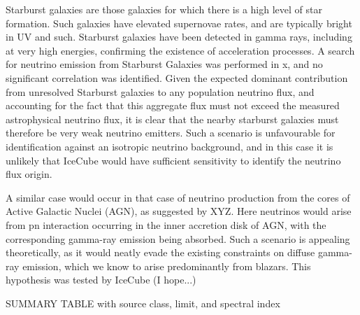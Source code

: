 Starburst galaxies are those galaxies for which there is a high level of star formation. Such galaxies have elevated supernovae rates, and are typically bright in UV and such. Starburst galaxies have been detected in gamma rays, including at very high energies, confirming the existence of acceleration processes. A search for neutrino emission from Starburst Galaxies was performed in x, and no significant correlation was identified. Given the expected dominant contribution from unresolved Starburst galaxies to any population neutrino flux, and accounting for the fact that this aggregate flux must not exceed the measured astrophysical neutrino flux, it is clear that the nearby starburst galaxies must therefore be very weak neutrino emitters. Such a scenario is unfavourable for identification against an isotropic neutrino background, and in this case it is unlikely that IceCube would have sufficient sensitivity to identify the neutrino flux origin.

A similar case would occur in that case of neutrino production from the cores of Active Galactic Nuclei (AGN), as suggested by XYZ. Here neutrinos would arise from pn interaction occurring in the inner accretion disk of AGN, with the corresponding gamma-ray emission being absorbed. Such a scenario is appealing theoretically, as it would neatly evade the existing constraints on diffuse gamma-ray emission, which we know to arise predominantly from blazars. This hypothesis was tested by IceCube (I hope...)

SUMMARY TABLE with source class, limit, and spectral index